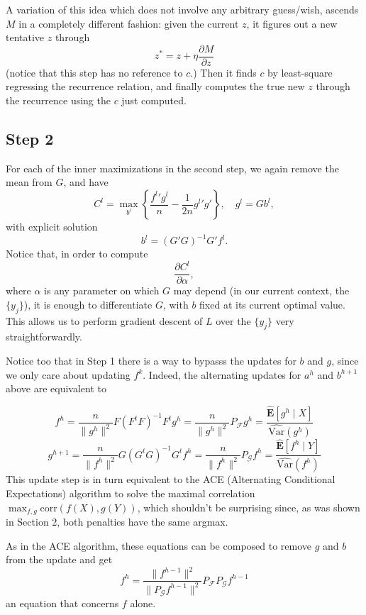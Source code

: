 \documentclass[a4paper,11pt]{article}
\newcommand{\E}{\mathbf E}
\theoremstyle{definition}
\begin{document}
\begin{enumerate}
A variation of this idea which does not involve any arbitrary guess/wish, ascends $M$ in a completely different fashion: given the current $z$, it figures out a new tentative $z$ through
%
$$ z^* = z + \eta \frac{\partial M}{\partial z} $$
%
(notice that this step has no reference to $c$.) Then it finds $c$ by least-square regressing the recurrence relation, and finally computes the true new $z$ through the recurrence using the $c$ just computed. 




\end{enumerate}


\subsection{Step 2}


For each of the inner maximizations in the second step, we again remove the mean from $G$, and have
%
$$ C^l =  \max_{b^l} \left\{\frac{{f^l}' g^l}{n} - \frac{1}{2n} {g^l}' g'\right\}, \quad  g^l = G b^l, $$
%
with explicit solution
%
$$ b^l = \left(G' G\right)^{-1} G' f^l. $$
%
Notice that, in order to compute
%
$$ \frac{\partial C^l}{\partial \alpha}, $$
%
where $\alpha$ is any parameter on which $G$ may depend (in our current context, the $\{y_j\}$), it is enough to differentiate $G$, with $b$ fixed at its current optimal value. This allows us to perform gradient descent of $L$ over the $\{y_j\}$ very straightforwardly.


Notice too that in Step 1 there is a way to bypasss the updates for $b$ and $g$, since we only care about updating $f^k$. Indeed, the alternating updates for $a^h$ and $b^{h+1}$ above are equivalent to


$$ f^{h} = \frac{n}{\|g^h\|^2} F(F^t F)^{-1} F^t g^h=\frac{n}{\|g^{h}\|^2} P_\mathcal{F}g^{h}=\frac{\widehat{\E}[g^h\mid X]}{\widehat{\text{Var}}(g^h)}$$
$$g^{h+1} = \frac{n}{\|f^{h}\|^2} G(G^t G)^{-1} G^tf^{h}=\frac{n}{\|f^{h}\|^2} P_\mathcal{G}f^{h}=\frac{\widehat{\E}[f^h\mid Y]}{\widehat{\text{Var}}(f^h)} $$
This update step is in turn equivalent to the ACE (Alternating Conditional Expectations) algorithm to solve the maximal correlation $\max_{f,g}\text{corr}(f(X),g(Y))$, which shouldn't be surprising since, as was shown in Section 2, both penalties have the same argmax.


As in the ACE algorithm, these equations can be composed to remove $g$ and $b$ from the update and get
$$f^h=\frac{\|f^{h-1}\|^2}{\|P_\mathcal{G}f^{h-1}\|^2
} P_\mathcal{F}P_\mathcal{G}f^{h-1}$$
an equation that concerns $f$ alone.
\end{document}
